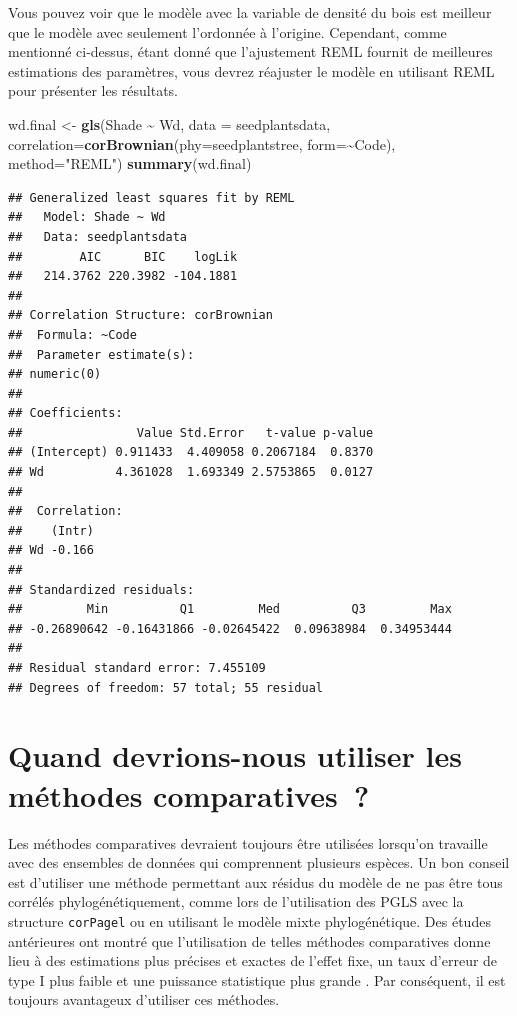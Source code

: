 \documentclass[
]{book}
\newenvironment{Shaded}{\begin{snugshade}}{\end{snugshade}}
\newcommand{\AttributeTok}[1]{\textcolor[rgb]{0.13,0.29,0.53}{#1}}
\newcommand{\FunctionTok}[1]{\textcolor[rgb]{0.13,0.29,0.53}{\textbf{#1}}}
\newcommand{\NormalTok}[1]{#1}
\newcommand{\OtherTok}[1]{\textcolor[rgb]{0.56,0.35,0.01}{#1}}
\newcommand{\SpecialCharTok}[1]{\textcolor[rgb]{0.81,0.36,0.00}{\textbf{#1}}}
\newcommand{\StringTok}[1]{\textcolor[rgb]{0.31,0.60,0.02}{#1}}
\begin{document}
Vous pouvez voir que le modèle avec la variable de densité du bois est meilleur que le modèle avec seulement l'ordonnée à l'origine. Cependant, comme mentionné ci-dessus, étant donné que l'ajustement REML fournit de meilleures estimations des paramètres, vous devrez réajuster le modèle en utilisant REML pour présenter les résultats.

\begin{Shaded}
\begin{Highlighting}[]
\NormalTok{wd.final }\OtherTok{\textless{}{-}} \FunctionTok{gls}\NormalTok{(Shade }\SpecialCharTok{\textasciitilde{}}\NormalTok{ Wd, }\AttributeTok{data =}\NormalTok{ seedplantsdata,}
                \AttributeTok{correlation=}\FunctionTok{corBrownian}\NormalTok{(}\AttributeTok{phy=}\NormalTok{seedplantstree, }\AttributeTok{form=}\SpecialCharTok{\textasciitilde{}}\NormalTok{Code), }
                \AttributeTok{method=}\StringTok{"REML"}\NormalTok{)}
\FunctionTok{summary}\NormalTok{(wd.final)}
\end{Highlighting}
\end{Shaded}

\begin{verbatim}
## Generalized least squares fit by REML
##   Model: Shade ~ Wd 
##   Data: seedplantsdata 
##        AIC      BIC    logLik
##   214.3762 220.3982 -104.1881
## 
## Correlation Structure: corBrownian
##  Formula: ~Code 
##  Parameter estimate(s):
## numeric(0)
## 
## Coefficients:
##                Value Std.Error   t-value p-value
## (Intercept) 0.911433  4.409058 0.2067184  0.8370
## Wd          4.361028  1.693349 2.5753865  0.0127
## 
##  Correlation: 
##    (Intr)
## Wd -0.166
## 
## Standardized residuals:
##         Min          Q1         Med          Q3         Max 
## -0.26890642 -0.16431866 -0.02645422  0.09638984  0.34953444 
## 
## Residual standard error: 7.455109 
## Degrees of freedom: 57 total; 55 residual
\end{verbatim}

\chapter{Quand devrions-nous utiliser les méthodes comparatives~?}\label{quand-devrions-nous-utiliser-les-muxe9thodes-comparatives}

Les méthodes comparatives devraient toujours être utilisées lorsqu'on travaille avec des ensembles de données qui comprennent plusieurs espèces. Un bon conseil est d'utiliser une méthode permettant aux résidus du modèle de ne pas être tous corrélés phylogénétiquement, comme lors de l'utilisation des PGLS avec la structure \texttt{corPagel} ou en utilisant le modèle mixte phylogénétique. Des études antérieures ont montré que l'utilisation de telles méthodes comparatives donne lieu à des estimations plus précises et exactes de l'effet fixe, un taux d'erreur de type I plus faible et une puissance statistique plus grande \citep{revell2010phylogenetic}. Par conséquent, il est toujours avantageux d'utiliser ces méthodes.
\end{document}
